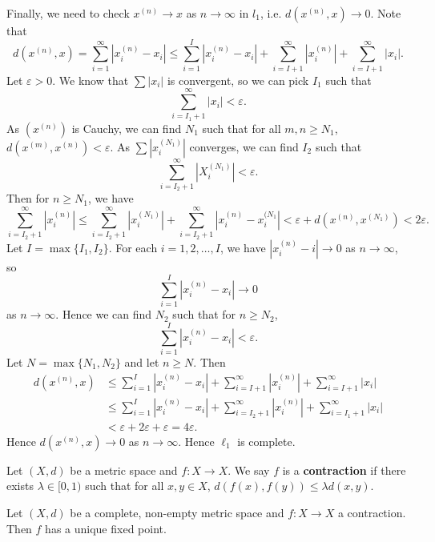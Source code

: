 \documentclass[12pt]{article}
\begin{document}
\begin{exbox}
	Finally, we need to check $x^{(n)} \to x$ as $n \to \infty$ in $l_1$, i.e. $d(x^{(n)}, x) \to 0$.
		Note that
		\[
			d(x^{(n)}, x) = \sum_{i = 1}^{\infty} |x_i^{(n)} - x_i| \leq \sum_{i = 1}^{I} |x_i^{(n)} - x_i| + \sum_{i = I+1}^{\infty}|x_i^{(n)}| + \sum_{i = I+1}^{\infty}|x_i|
		.\]
		Let $\varepsilon > 0$. We know that $\sum |x_i|$ is convergent, so we can pick $I_1$ such that 
		\[
		\sum_{i = I_1 + 1}^{\infty}|x_i| < \varepsilon
		.\]
		As $(x^{(n)})$ is Cauchy, we can find $N_1$ such that for all $m, n \geq N_1$, $d(x^{(m)}, x^{(n)}) < \varepsilon$. As $\sum |x_i^{(N_1)}|$ converges, we can find $I_2$ such that
		\[
			\sum_{i = I_2 + 1}^{\infty} |X_i^{(N_1)}| < \varepsilon
		.\]
		Then for $n \geq N_1$, we have
		\[
			\sum_{i = I_2 + 1}^{\infty}|x_i^{(n)}| \leq \sum_{i = I_2 + 1}^{\infty}|x_i^{(N_1)}| + \sum_{i = I_2 + 1}^{\infty}|x_i^{(n)} - x_i^{(N_1}| < \varepsilon + d(x^{(n)}, x^{(N_1)}) < 2 \varepsilon
		.\]
		Let $I = \max\{I_1, I_2\}$. For each $i = 1, 2, \ldots, I$, we have $|x_i^{(n)} - i| \to 0$ as $n \to \infty$, so
		\[
			\sum_{i = 1}^{I}|x_i^{(n)} - x_i| \to 0
		\]
		as $n \to \infty$. Hence we can find $N_2$ such that for $n \geq N_2$,
		\[
			\sum_{i = 1}^{I}|x_i^{(n)} - x_i| < \varepsilon
		.\]
		Let $N = \max\{N_1, N_2\}$ and let $n \geq N$. Then
		\begin{align*}
			d(x^{(n)}, x) &\leq \sum_{i = 1}^{I}|x_i^{(n)} - x_i| + \sum_{i = I+1}^{\infty}|x_i^{(n)}| + \sum_{i = I+1}^{\infty}|x_i| \\
				      &\leq \sum_{i = 1}^{I}|x_i^{(n)} - x_i| + \sum_{i = I_2 + 1}^{\infty}|x_i^{(n)}| + \sum_{i = I_1 + 1}^{\infty}|x_i| \\
				      &< \varepsilon + 2\varepsilon + \varepsilon = 4\varepsilon.
		\end{align*}
		Hence $d(x^{(n)}, x) \to 0$ as $n \to \infty$. Hence $\ell_1$ is complete.
\end{exbox}

\begin{definition}
	Let $(X, d)$ be a metric space and $f : X \to X$. We say $f$ is a \textbf{contraction} if there exists $\lambda \in [0, 1)$ such that for all $x,y \in X$, $d(f(x), f(y)) \leq \lambda d(x, y)$.
\end{definition}

\begin{theorem}
	Let $(X, d)$ be a complete, non-empty metric space and $f : X \to X$ a contraction. Then $f$ has a unique fixed point.
\end{theorem}
\end{document}
